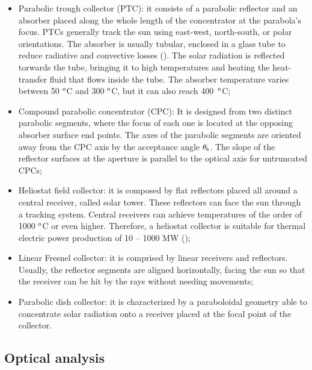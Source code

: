 \begin{itemize}
	\item Parabolic trough collector (PTC): it consists of a parabolic reflector and an absorber placed along the whole length of the concentrator at the parabola's focus. PTCs generally track the sun using east-west, north-south, or polar orientations. The absorber is usually tubular, enclosed in a glass tube to reduce radiative and convective losses (\cite{Goswami2015}). The solar radiation is reflected torwards the tube, bringing it to high temperatures and heating the heat-transfer fluid that flows inside the tube. The absorber temperature varies between 50 $^{\rm{o}}$C and 300 $^{\rm{o}}$C, but it can also reach \mbox{400 $^{\rm{o}}$C};
	
	\item Compound parabolic concentrator (CPC): It is designed from two distinct parabolic segments, where the focus of each one is located at the opposing absorber surface end points. The axes of the parabolic segments are oriented away from the CPC axis by the acceptance angle $\theta_{{\rm{a}}}$. The slope of the reflector surfaces at the aperture is parallel to the optical axis for untruncated CPCs;
	
	\item Heliostat field collector: it is composed by flat reflectors placed all around a central receiver, called solar tower. These reflectors can face the sun through a tracking system. Central receivers can achieve temperatures of the order of 1000 $^{\rm{o}}$C or even higher. Therefore, a heliostat collector is suitable for thermal electric power production of 10 -- 1000 MW (\cite{Goswami2015});
	
	\item Linear Fresnel collector: it is comprised by linear receivers and reflectors. Usually, the reflector segments are aligned horizontally, facing the sun so that the receiver can be hit by the rays without needing movements;
	
	\item Parabolic dish collector: it is characterized by a paraboloidal geometry able to concentrate solar radiation onto a receiver placed at the focal point of the collector.
	
\end{itemize}

\subsection{Optical analysis}


